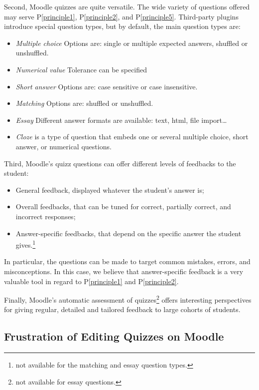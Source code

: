\documentclass[twocolumn,a4paper,9pt]{article}
\begin{document}
Second, Moodle quizzes are quite versatile. The wide variety of questions 
offered may serve P\ref{principle1}, P\ref{principle2}, and P\ref{principle5}. 
Third-party plugins introduce special question types, but by default, the main 
question types are:
\begin{itemize}
\item \emph{Multiple choice} Options are: single or multiple expected 
answers, shuffled or unshuffled.
\item \emph{Numerical value} Tolerance can be specified
\item \emph{Short answer} Options are: case sensitive or case insensitive.
\item \emph{Matching} Options are: shuffled or unshuffled.
\item \emph{Essay} Different answer formats are available: text, html, file 
import\dots
\item \emph{Cloze} is a type of question that embeds one or several multiple 
choice, short answer, or numerical questions.
\end{itemize}

Third, Moodle's quizz questions can offer different levels of feedbacks 
to the student:
\begin{itemize}
	\item General feedback, displayed whatever the student's answer is;
	\item Overall feedbacks, that can be tuned for correct, partially correct, 
	and incorrect responses;
	\item Answer-specific feedbacks, that depend on the specific answer the 
	student gives.\footnote{not available for the matching and essay question 
	types.}
\end{itemize}
In particular, the questions can be made to target common mistakes, errors, 
and misconceptions. In this case, we believe that answer-specific feedback is a 
very valuable tool in regard to P\ref{principle1} and P\ref{principle2}.

Finally, Moodle's automatic assessment of quizzes\footnote{not available for 
essay questions.} 
offers interesting perspectives for giving regular, detailed and tailored 
feedback to large cohorts of students.

\subsection{Frustration of Editing Quizzes on Moodle}
\end{document}
